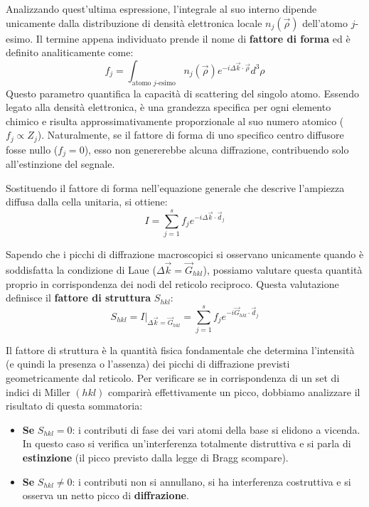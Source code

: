 Analizzando quest'ultima espressione, l'integrale al suo interno dipende unicamente dalla distribuzione di densità elettronica locale \(n_j(\vec{\rho})\) dell'atomo \(j\)-esimo. 
Il termine appena individuato prende il nome di \textbf{fattore di forma} ed è definito analiticamente come:
\begin{equation}
    f_j = \int_{\text{atomo } j\text{-esimo}} n_j(\vec{\rho}) e^{-i \Delta\vec{k} \cdot \vec{\rho}} d^3\rho
\end{equation}
Questo parametro quantifica la capacità di scattering del singolo atomo. Essendo legato alla densità elettronica, è una grandezza specifica per ogni elemento chimico e risulta approssimativamente proporzionale al suo numero atomico (\( f_j \propto Z_j \)). Naturalmente, se il fattore di forma di uno specifico centro diffusore fosse nullo (\( f_j = 0 \)), esso non genererebbe alcuna diffrazione, contribuendo solo all'estinzione del segnale.

Sostituendo il fattore di forma nell'equazione generale che descrive l'ampiezza diffusa dalla cella unitaria, si ottiene:
\begin{equation}
    I = \sum_{j=1}^{s} f_j e^{-i \Delta\vec{k} \cdot \vec{d}_j}
\end{equation}

Sapendo che i picchi di diffrazione macroscopici si osservano unicamente quando è soddisfatta la condizione di Laue (\( \Delta\vec{k} = \vec{G}_{hkl} \)), possiamo valutare questa quantità proprio in corrispondenza dei nodi del reticolo reciproco. Questa valutazione definisce il \textbf{fattore di struttura} \( S_{hkl} \):
\begin{equation}
    S_{hkl} = I \Big|_{\Delta\vec{k} = \vec{G}_{hkl}} = \sum_{j=1}^{s} f_j e^{-i \vec{G}_{hkl} \cdot \vec{d}_j}
\end{equation}

Il fattore di struttura è la quantità fisica fondamentale che determina l'intensità (e quindi la presenza o l'assenza) dei picchi di diffrazione previsti geometricamente dal reticolo. Per verificare se in corrispondenza di un set di indici di Miller \( (hkl) \) comparirà effettivamente un picco, dobbiamo analizzare il risultato di questa sommatoria:
\begin{itemize}
    \item \textbf{Se} \( S_{hkl} = 0 \): i contributi di fase dei vari atomi della base si elidono a vicenda. In questo caso si verifica un'interferenza totalmente distruttiva e si parla di \textbf{estinzione} (il picco previsto dalla legge di Bragg scompare).
    \item \textbf{Se} \( S_{hkl} \neq 0 \): i contributi non si annullano, si ha interferenza costruttiva e si osserva un netto picco di \textbf{diffrazione}.
\end{itemize}

